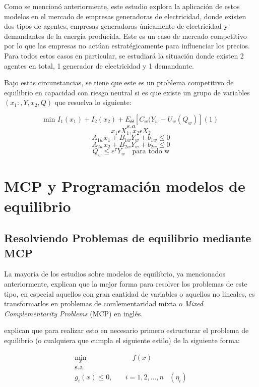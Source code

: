 Como se mencionó anteriormente, este estudio explora la aplicación de estos modelos en el mercado de empresas generadoras de electricidad, donde existen dos tipos de agentes, empresas generadoras únicamente de electricidad y demandantes de la energía producida. Este es un caso de mercado competitivo por lo que las empresas no actúan estratégicamente para influenciar los precios. Para todos estos casos en particular, se estudiará la situación donde existen 2 agentes en total, 1 generador de electricidad y 1 demandante. 
\vspace{2.5mm}

Bajo estas circunstancias, se tiene que este es un problema competitivo de equilibrio en capacidad con riesgo neutral si es que existe un grupo de variables $(x_{1}:, Y, x_{2}, Q)$ que resuelva lo siguiente: 

$$ \text{min } I_{1}(x_{1})+ I_{2}(x_{2})+E_{\Theta}[C_{w}(Y_{w}-U_{w}(Q_{w})] (1)$$
$$s.a$$
$$ x_{1} \epsilon X_{1} ,x_{2} \epsilon X_{2}$$
$$A_{1w}x_{1}+B_{1w}Y_{w}+b_{1w} \le 0 $$
$$A_{2w}x_{2}+B_{2w}Y_{w}+b_{2w} \le 0 $$
$$Q_{w}\le e^{\tau}Y_{w}\text{  }\text{ para todo w}$$



\section{MCP y Programación modelos de equilibrio}

\subsection{Resolviendo Problemas de equilibrio mediante MCP}\label{descripcionkkt}

La mayoría de los estudios sobre modelos de equilibrio, ya mencionados anteriormente, explican que la mejor forma para resolver los problemas de este tipo, en especial aquellos con gran cantidad de variables o aquellos no lineales, es transformarlos en problemas de comlementaridad mixta o \textit{Mixed Complementarity Problems} (MCP) en inglés.
\vspace{2.5mm}

 explican que para realizar esto en necesario primero estructurar el problema de equilibrio (o cualquiera que cumpla el siguiente estilo) de la siguiente forma:

\begin{align}
    \min_{x} & \quad f(x) \label{foej1}\\ 
    \textrm{s.a.} \nonumber\\
    g_{i}(x) \leq 0 ,\quad & i=1,2,...,n  &(\eta_{i}) \label{resej1} 
\end{align}

